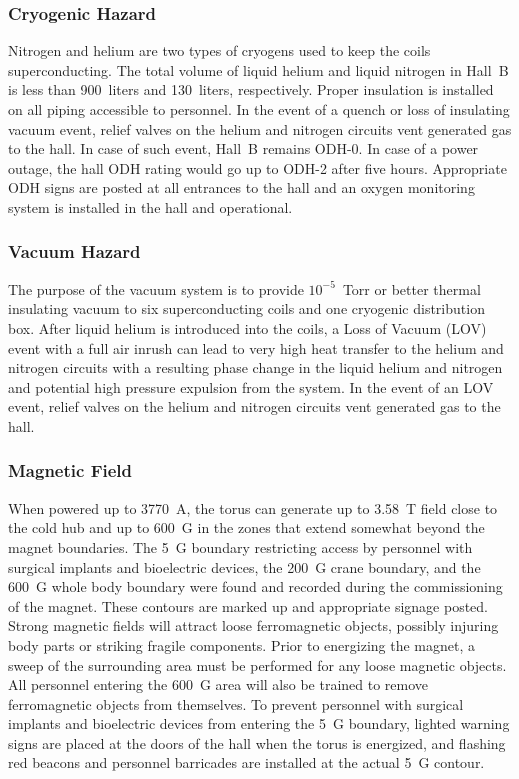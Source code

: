 \subsubsection{Cryogenic Hazard}

Nitrogen and helium are two types of cryogens used to keep the coils superconducting. The 
total volume of liquid helium and liquid nitrogen in Hall~B is less than 900~liters and 
130~liters, respectively. Proper insulation is installed on all piping accessible to 
personnel. In the event of a quench or loss of insulating vacuum event, relief valves on 
the helium and nitrogen circuits vent generated gas to the hall. In case of such event, 
Hall~B remains ODH-0. In case of a power outage, the hall ODH rating would go up to ODH-2 
after five hours. Appropriate ODH signs are posted at all entrances to the hall and an 
oxygen monitoring system is installed in the hall and operational.

\subsubsection{Vacuum Hazard}

The purpose of the vacuum system is to provide $10^{-5}$~Torr or better thermal insulating 
vacuum to six superconducting coils and one cryogenic distribution box. After liquid helium 
is introduced into the coils, a Loss of Vacuum (LOV) event with a full air inrush can lead to
very high heat transfer to the helium and nitrogen circuits with a resulting phase change in 
the liquid helium and nitrogen and potential high pressure expulsion from the system. In the 
event of an LOV event, relief valves on the helium and nitrogen circuits vent generated
gas to the hall.

\subsubsection{Magnetic Field}

When powered up to 3770~A, the torus can generate up to 3.58~T field close to the cold hub 
and up to 600~G in the zones that extend somewhat beyond the magnet boundaries. The 5~G 
boundary restricting access by personnel with surgical implants and bioelectric devices, the
200~G crane boundary, and the 600~G whole body boundary were found and recorded during the 
commissioning of the magnet. These contours are marked up and appropriate signage posted.
Strong magnetic fields will attract loose ferromagnetic objects, possibly injuring body parts 
or striking fragile components. Prior to energizing the magnet, a sweep of the surrounding 
area must be performed for any loose magnetic objects. All personnel entering the 600~G area 
will also be trained to remove ferromagnetic objects from themselves. To prevent personnel with 
surgical implants and bioelectric devices from entering the 5~G boundary, lighted warning signs 
are placed at the doors of the hall when the torus is energized, and flashing red beacons
and personnel barricades are installed at the actual 5~G contour.

